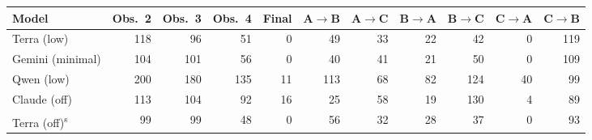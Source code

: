 \begin{adjustbox}{max width=\linewidth}
\begin{tabular}{@{}lrrrrrrrrrr@{}}
\toprule
Model & Obs.\ 2 & Obs.\ 3 & Obs.\ 4 & Final & A$\to$B & A$\to$C & B$\to$A & B$\to$C & C$\to$A & C$\to$B \\
\midrule
Terra (low) & 118 & 96 & 51 & 0 & 49 & 33 & 22 & 42 & 0 & 119 \\
Gemini (minimal) & 104 & 101 & 56 & 0 & 40 & 41 & 21 & 50 & 0 & 109 \\
Qwen (low) & 200 & 180 & 135 & 11 & 113 & 68 & 82 & 124 & 40 & 99 \\
Claude (off) & 113 & 104 & 92 & 16 & 25 & 58 & 19 & 130 & 4 & 89 \\
Terra (off)\textsuperscript{s} & 99 & 99 & 48 & 0 & 56 & 32 & 28 & 37 & 0 & 93 \\
\bottomrule
\end{tabular}
\end{adjustbox}

\par{}
